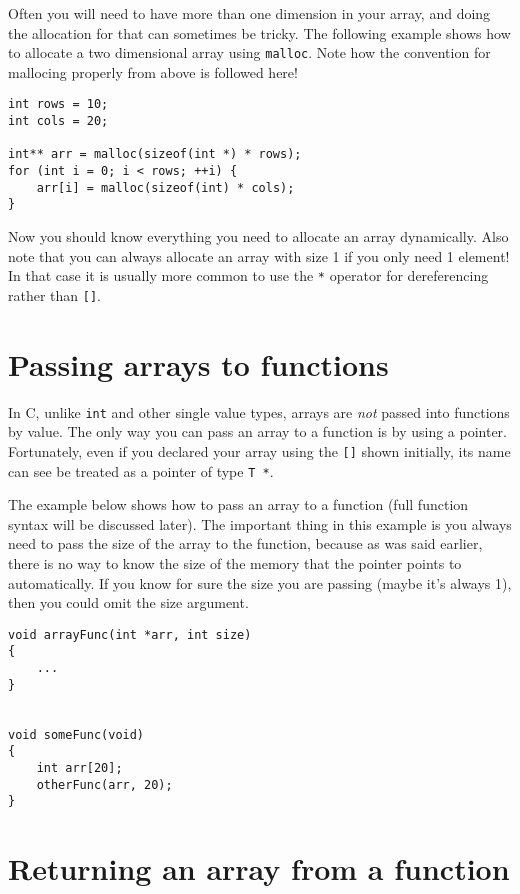 Often you will need to have more than one dimension in your array, and doing the allocation for that can sometimes be tricky.
The following example shows how to allocate a two dimensional array using \texttt{malloc}.
Note how the convention for mallocing properly from above is followed here! 

\begin{lstlisting}
int rows = 10;
int cols = 20;

int** arr = malloc(sizeof(int *) * rows);
for (int i = 0; i < rows; ++i) {
    arr[i] = malloc(sizeof(int) * cols);
}
\end{lstlisting}

Now you should know everything you need to allocate an array dynamically.
Also note that you can always allocate an array with size 1 if you only need 1 element!
In that case it is usually more common to use the \texttt{*} operator for dereferencing rather than \texttt{[]}.

\section{Passing arrays to functions}

In C, unlike \texttt{int} and other single value types, arrays are \emph{not} passed into functions by value.
The only way you can pass an array to a function is by using a pointer.
Fortunately, even if you declared your array using the \texttt{[]} shown initially, its name can see be treated as a pointer of type \texttt{T *}.

The example below shows how to pass an array to a function (full function syntax will be discussed later).
The important thing in this example is you always need to pass the size of the array to the function, because as was said earlier, there is no way to know the size of the memory that the pointer points to automatically.
If you know for sure the size you are passing (maybe it's always 1), then you could omit the size argument.

\begin{lstlisting}
void arrayFunc(int *arr, int size)
{
    ...
}


void someFunc(void)
{
    int arr[20];
    otherFunc(arr, 20);
}
\end{lstlisting}

\section{Returning an array from a function}

